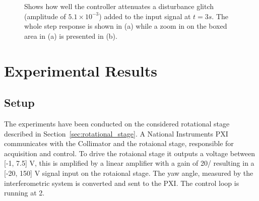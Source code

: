 \begin{figure}[h]
  \centering %
  \qquad
  \caption{\label{fig:distrejection} Shows how well the controller attenuates a disturbance glitch (amplitude of $5.1 \times 10^{-3}$) added to the input signal at $t=3s$. The whole step response is shown in (a) while a zoom in on the boxed area in (a) is presented in (b).}
\end{figure}


\section{Experimental Results}
\subsection{Setup}
The experiments have been conducted on the considered rotational stage described in Section~\ref{sec:rotational_stage}. A National Instruments PXI communicates with the Collimator and the rotaional stage, responsible for acquisition and control. To drive the rotaional stage it outputs a voltage between [-1, 7.5] V, this is amplified by a linear amplifier with a gain of \unit{20}{\volt/\volt} resulting in a [-20, 150] V signal input on the rotaional stage. The yaw angle, measured by the interferometric system is converted and sent to the PXI. The control loop is running at \unit{2}{\kilo\hertz}.

